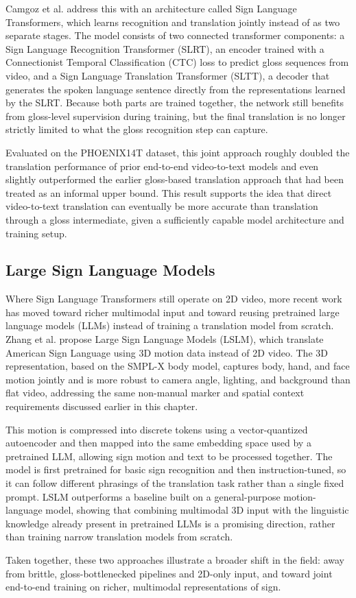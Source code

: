 Camgoz et al. \cite{cihancamgozSignLanguageTransformers2020} address this with an architecture called Sign Language Transformers, which learns recognition and translation jointly instead of as two separate stages. The model consists of two connected transformer components: a Sign Language Recognition Transformer (SLRT), an encoder trained with a Connectionist Temporal Classification (CTC) loss to predict gloss sequences from video, and a Sign Language Translation Transformer (SLTT), a decoder that generates the spoken language sentence directly from the representations learned by the SLRT. Because both parts are trained together, the network still benefits from gloss-level supervision during training, but the final translation is no longer strictly limited to what the gloss recognition step can capture.
 
Evaluated on the PHOENIX14T dataset, this joint approach roughly doubled the translation performance of prior end-to-end video-to-text models and even slightly outperformed the earlier gloss-based translation approach that had been treated as an informal upper bound. This result supports the idea that direct video-to-text translation can eventually be more accurate than translation through a gloss intermediate, given a sufficiently capable model architecture and training setup.
 
\subsection{Large Sign Language Models}
Where Sign Language Transformers still operate on 2D video, more recent work has moved toward richer multimodal input and toward reusing pretrained large language models (LLMs) instead of training a translation model from scratch. Zhang et al. \cite{zhangLargeSignLanguage2025a} propose Large Sign Language Models (LSLM), which translate American Sign Language using 3D motion data instead of 2D video. The 3D representation, based on the SMPL-X body model, captures body, hand, and face motion jointly and is more robust to camera angle, lighting, and background than flat video, addressing the same non-manual marker and spatial context requirements discussed earlier in this chapter.
 
This motion is compressed into discrete tokens using a vector-quantized autoencoder and then mapped into the same embedding space used by a pretrained LLM, allowing sign motion and text to be processed together. The model is first pretrained for basic sign recognition and then instruction-tuned, so it can follow different phrasings of the translation task rather than a single fixed prompt. LSLM outperforms a baseline built on a general-purpose motion-language model, showing that combining multimodal 3D input with the linguistic knowledge already present in pretrained LLMs is a promising direction, rather than training narrow translation models from scratch.
 
Taken together, these two approaches illustrate a broader shift in the field: away from brittle, gloss-bottlenecked pipelines and 2D-only input, and toward joint end-to-end training on richer, multimodal representations of sign.
 
